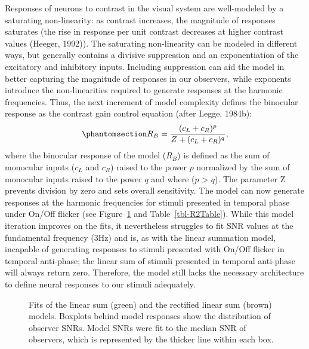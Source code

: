 \documentclass[
  12pt,
]{article}
\begin{document}
Responses of neurons to contrast in the visual system are well-modeled
by a saturating non-linearity: as contrast increases, the magnitude of
responses saturates (the rise in response per unit contrast decreases at
higher contrast values (Heeger, 1992)). The saturating non-linearity can
be modeled in different ways, but generally contains a divisive
suppression and an exponentiation of the excitatory and inhibitory
inputs. Including suppression can aid the model in better capturing the
magnitude of responses in our observers, while exponents introduce the
non-linearities required to generate responses at the harmonic
frequencies. Thus, the next increment of model complexity defines the
binocular response as the contrast gain control equation (after Legge,
1984b): \begin{equation}\phantomsection\label{eq-firstBinocSum}{
R_B = \frac{(c_L+c_R)^p}{Z+(c_L+c_R)^q},
}\end{equation} where the binocular response of the model (\(R_B\)) is
defined as the sum of monocular inputs (\(c_L\) and \(c_R\)) raised to
the power \(p\) normalized by the sum of monocular inputs raised to the
power \(q\) and where (\(p\) \textgreater{} \(q\)). The parameter Z
prevents division by zero and sets overall sensitivity. The model can
now generate responses at the harmonic frequencies for stimuli presented
in temporal phase under On/Off flicker (see Figure~\ref{fig-badModels1}
and Table~\ref{tbl-R2Table}). While this model iteration improves on the
fits, it nevertheless struggles to fit SNR values at the fundamental
frequency (3Hz) and is, as with the linear summation model, incapable of
generating responses to stimuli presented with On/Off flicker in
temporal anti-phase; the linear sum of stimuli presented in temporal
anti-phase will always return zero. Therefore, the model still lacks the
necessary architecture to define neural responses to our stimuli
adequately.

\begin{figure}


\caption{\label{fig-badModels1}Fits of the linear sum (green) and the
rectified linear sum (brown) models. Boxplots behind model responses
show the distribution of observer SNRs. Model SNRs were fit to the
median SNR of observers, which is represented by the thicker line within
each box.}

\end{figure}%
\end{document}
